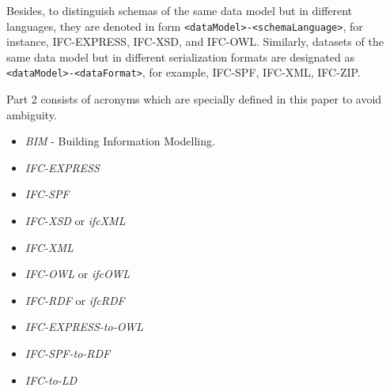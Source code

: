 \begin{itemize}
\end{itemize}



Besides, to distinguish schemas of the same data model but in different languages, they are denoted in form \texttt{<da\-ta\-Mod\-el>-<sche\-ma\-Lan\-guage>}, for instance, IFC-EXPRESS, IFC-XSD, and IFC-OWL.
Similarly, datasets of the same data model but in different serialization formats are designated as \texttt{<da\-ta\-Mod\-el>-<da\-ta\-For\-mat>}, for example, IFC-SPF, IFC-XML, IFC-ZIP.


Part 2 consists of acronyms which are specially defined in this paper to avoid ambiguity.

\begin{itemize}
    \item \emph{BIM} - Building Information Modelling. 
    \item \emph{IFC-EXPRESS} 
    \item \emph{IFC-SPF} 
    \item \emph{IFC-XSD} or \emph{ifcXML}
    \item \emph{IFC-XML} 
    \item \emph{IFC-OWL} or \emph{ifcOWL}
    \item \emph{IFC-RDF} or \emph{ifcRDF}
    \item \emph{IFC-EXPRESS-to-OWL}
    \item \emph{IFC-SPF-to-RDF}
    \item \emph{IFC-to-LD}
\end{itemize}


